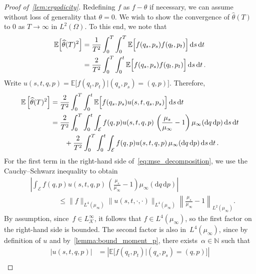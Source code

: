 \documentclass[onefignum,onetabnum]{siamart251216} %
\renewcommand{\d}{\mathrm{d}}
\newcommand{\expect}{\mathbb E}
\newcommand{\mc}[1]{\mathcal{#1}}
\renewcommand{\leq}{\leqslant}
\theoremstyle{plain}
\numberwithin{equation}{section}
\numberwithin{theorem}{section}
\begin{document}
\begin{proof}[Proof of~\cref{lem:ergodicity}]
Redefining $f$ as $f - \theta$ if necessary,
we can assume without loss of generality that $\theta = 0$.
We wish to show the convergence of $\widehat \theta(T)$ to 0 as $T \to \infty$ in $L^2(\Omega)$.
To this end, we note that
\begin{align*}
    \expect\!\left[ \widehat \theta(T)^2 \right]
    &= \frac{1}{T^2} \int_{0}^{T} \int_{0}^{T} \expect\Bigl[ f(q_s, p_s) f(q_t, p_t) \Bigr] \, \d s \, \d t \\
    &= \frac{2}{T^2} \int_{0}^{T} \int_{0}^{t} \expect\Bigl[ f(q_s, p_s) f(q_t, p_t) \Bigr] \, \d s \, \d t \, .
\end{align*}
Write $u(s, t, q, p) = \expect\bigl[ f(q_t, p_t) | (q_s, p_s) = (q, p)\bigr]$.
Therefore,
\begin{align}
    \notag
    \expect\left[ \widehat \theta(T)^2 \right]
    &= \frac{2}{T^2} \int_{0}^{T} \int_{0}^{t} \expect\Bigl[ f(q_s, p_s) u(s, t, q_s, p_s) \Bigr] \, \d s \, \d t \, \\
    \notag
    &=
    \frac{2}{T^2} \int_{0}^{T} \int_{0}^{t} \int_{\mathcal E}  f(q, p) u(s, t, q, p) \, \left(\frac{\mu_s}{\mu_{\infty}} - 1\right) \mu_{\infty}(\d q\,\d p)  \, \d s \, \d t \\
    \label{eq:mse_decomposition}
    &\qquad + \frac{2}{T^2} \int_{0}^{T} \int_{0}^{t} \int_{\mathcal E}  f(q, p) u(s, t, q, p) \, \mu_{\infty} (\d q\,\d p) \, \d s \, \d t \, .
\end{align}
For the first term in the right-hand side of~\eqref{eq:mse_decomposition}, we use the Cauchy--Schwarz inequality to obtain
\begin{align}
    &\left| \int_{\mathcal E}  f(q, p) u(s, t, q, p) \, \left(\frac{\mu_s}{ \mu_{\infty}} - 1\right) \mu_{\infty}(\d q\,\d p) \right| \\
    &\qquad\qquad\leq \|f\|_{L^4(\mu_{\infty})} \lVert u(s, t, \cdot, \cdot) \rVert_{L^4(\mu_{\infty})}
    \left\|\frac{ \mu_s}{\mu_{\infty}} - 1\right\|_{L^2(\mu_{\infty})} \!.
\end{align}
By assumption, since~$f \in L_{\mc{K}}^\infty$, it follows that $f \in L^4(\mu_{\infty})$,
so the first factor on the right-hand side is bounded.
The second factor is also in~$L^4(\mu_{\infty})$,
since by definition of $u$ and by~\cref{lemma:bound_moment_p}, there exists~$\alpha \in \mathbb{N}$ such that
\begin{align*}
   |u(s, t, q, p)| &= \left|\expect\bigl[ f(q_t, p_t) | (q_s, p_s) = (q, p)\bigr]\right|\\

\end{align*}
\end{proof}
\end{document}
